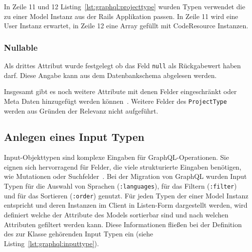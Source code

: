 In Zeile 11 und 12 Listing~\ref{lst:graphql:projecttype} wurden Typen verwendet die zu einer Model Instanz aus der Rails Applikation passen. In Zeile 11 wird eine User Instanz erwartet, in Zeile 12 eine Array gefüllt mit CodeResource Instanzen.

\subsubsection{Nullable}
Als drittes Attribut wurde festgelegt ob das Feld \lstinline|null| als Rückgabewert haben darf. Diese Angabe kann aus dem Datenbankschema abgelesen werden.

Insgesamt gibt es noch  weitere Attribute mit denen Felder eingeschränkt oder Meta Daten hinzugefügt werden können~\cite{graphql-field-introduction}.
Weitere Felder des \lstinline|ProjectType| werden aus Gründen der Relevanz nicht aufgeführt. 

\subsection{Anlegen eines Input Typen}
\label{impl:graphql:input}
Input-Objekttypen sind komplexe Eingaben für GraphQL-Operationen. Sie eignen sich hervorragend für Felder, die viele strukturierte Eingaben benötigen, wie Mutationen oder Suchfelder~\cite{graphql-input-type}.
Bei der Migration von GraphQL wurden Input Typen für die Auswahl von Sprachen (\lstinline|:languages|), für das Filtern (\lstinline|:filter|) und für das Sortieren (\lstinline|:order|) genutzt.
Für jeden Typen der einer Model Instanz entspricht und deren Instanzen im Client in Listen-Form dargestellt werden, wird definiert welche der Attribute des Models sortierbar sind und nach welchen Attributen gefiltert werden kann. Diese Informationen fließen bei der Definition des zur Klasse gehörenden Input Typen ein (siehe Listing~\ref{lst:graphql:inputtype}).

